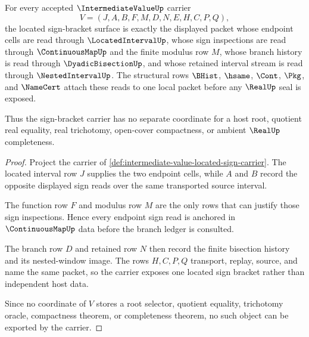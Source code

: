 \begin{theorem}
\label{thm:intermediate-value-sign-bracket-carrier}
For every accepted $\IntermediateValueUp$ carrier
$$
V=(J,A,B,F,M,D,N,E,H,C,P,Q),
$$
the located sign-bracket surface is exactly the displayed packet whose endpoint cells are read through $\LocatedIntervalUp$, whose sign inspections are read through $\ContinuousMapUp$ and the finite modulus row $M$, whose branch history is read through $\DyadicBisectionUp$, and whose retained interval stream is read through $\NestedIntervalUp$. The structural rows $\BHist$, $\hsame$, $\Cont$, $\Pkg$, and $\NameCert$ attach these reads to one local packet before any $\RealUp$ seal is exposed.

Thus the sign-bracket carrier has no separate coordinate for a host root, quotient real equality, real trichotomy, open-cover compactness, or ambient $\RealUp$ completeness.
\end{theorem}
\begin{proof}
Project the carrier of \autoref{def:intermediate-value-located-sign-carrier}. The located interval row $J$ supplies the two endpoint cells, while $A$ and $B$ record the opposite displayed sign reads over the same transported source interval.

The function row $F$ and modulus row $M$ are the only rows that can justify those sign inspections. Hence every endpoint sign read is anchored in $\ContinuousMapUp$ data before the branch ledger is consulted.

The branch row $D$ and retained row $N$ then record the finite bisection history and its nested-window image. The rows $H,C,P,Q$ transport, replay, source, and name the same packet, so the carrier exposes one located sign bracket rather than independent host data.

Since no coordinate of $V$ stores a root selector, quotient equality, trichotomy oracle, compactness theorem, or completeness theorem, no such object can be exported by the carrier.
\end{proof}


